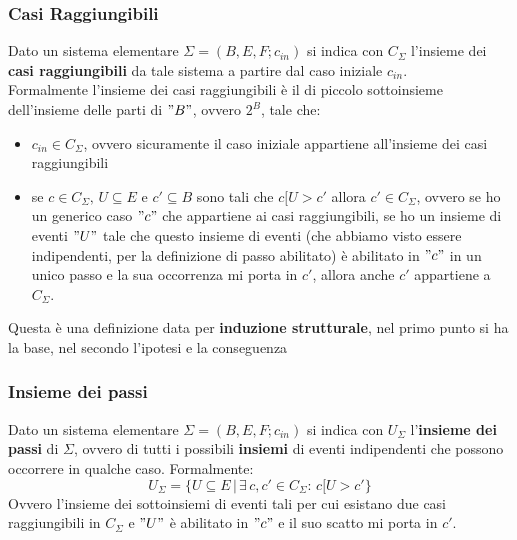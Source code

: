 \subsubsection{Casi Raggiungibili}
\begin{definizione}
  Dato un sistema elementare $\Sigma=(B, E, F;c_{in})$ si indica con $C_\Sigma$
  l'insieme dei \textbf{casi raggiungibili} da tale sistema a partire dal caso
  iniziale $c_{in}$.\\
  Formalmente l'insieme dei casi raggiungibili è il di piccolo sottoinsieme
  dell'insieme delle parti di $"B"$, ovvero $2^B$, tale che:
  \begin{itemize}
    \item $c_{in}\in C_\Sigma$, ovvero sicuramente il caso iniziale appartiene
    all'insieme dei casi raggiungibili
    \item se $c\in C_\Sigma,\, U\subseteq E$ e $c'\subseteq B$ sono tali che
    $c[U>c'$ allora $c'\in C_\Sigma$, ovvero se ho un generico caso $"c"$ che
    appartiene ai casi raggiungibili, se ho un insieme di eventi $"U"$ tale che
    questo insieme di eventi (che abbiamo visto essere indipendenti, per la
    definizione di passo abilitato) è abilitato
    in $"c"$ in un unico passo e la sua occorrenza mi porta in $c'$, allora anche
    $c'$ appartiene a $C_\Sigma$. 
  \end{itemize}
  Questa è una definizione data per \textbf{induzione strutturale}, nel primo
  punto si ha la base, nel secondo l'ipotesi e la conseguenza
\end{definizione} \vspace{5mm} %
\subsubsection{Insieme dei passi}
\begin{definizione}
  Dato un sistema elementare $\Sigma=(B, E, F;c_{in})$ si indica con $U_\Sigma$
  l'\textbf{insieme dei passi} di $\Sigma$, ovvero di tutti i possibili \textbf{insiemi}
  di eventi indipendenti che possono occorrere in qualche caso. Formalmente:
  \[U_\Sigma =\{U\subseteq E\,|\,\exists\, c, c'\in C_\Sigma :\, c[U>c'\}\]
  Ovvero l'insieme dei sottoinsiemi di eventi tali per cui esistano due casi
  raggiungibili in $C_\Sigma$ e $"U"$ è abilitato in $"c"$ e il suo scatto mi porta
  in $c'$.
\end{definizione} \vspace{5mm} %
